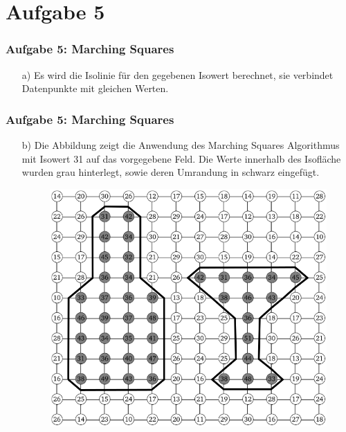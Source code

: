 \documentclass[accentcolor=tud9c,colorbacktitle,inverttitle,landscape,german,presentation,t]{tudbeamer}
\begin{document}
\section{Aufgabe 5}
\begin{frame}
	\frametitle{Aufgabe 5: Marching Squares}
	\begin{itemize}
		\item[a)] Es wird die Isolinie für den gegebenen Isowert berechnet, sie verbindet Datenpunkte mit gleichen Werten.
		
	\end{itemize}
\end{frame}
\begin{frame}
	\frametitle{Aufgabe 5: Marching Squares}
	\begin{itemize}
		\item[b)]
		Die Abbildung zeigt die Anwendung des Marching Squares Algorithmus mit Isowert 31 auf das vorgegebene Feld. Die Werte innerhalb des Isofläche wurden grau hinterlegt, sowie deren Umrandung in schwarz eingefügt.
		\begin{figure}
			\includegraphics[width = .4\linewidth]{task_5b.png}
			\label{MaSq}
		\end{figure}
	\end{itemize}
\end{frame}
\end{document}
